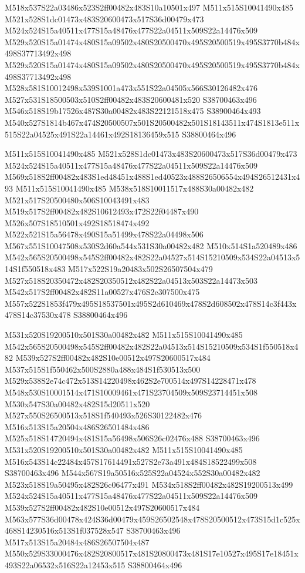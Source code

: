 \documentclass{article}
\begin{document}
\begin{multicols}{2}
M518x537S22a03486x523S2ff00482x483S10a10501x497 M511x515S10041490x485 M521x528S1dc01473x483S20600473x517S36d00479x473 M524x524S15a40511x477S15a48476x477S22a04511x509S22a14476x509 M529x520S15a01474x480S15a09502x480S20500470x495S20500519x495S3770b484x498S37713492x498 M529x520S15a01474x480S15a09502x480S20500470x495S20500519x495S3770b484x498S37713492x498 M528x581S10012498x539S1001a473x551S22a04505x566S30126482x476 M527x531S18500503x510S2ff00482x483S20600481x520 S38700463x496 M546x518S19b17526x487S30a00482x483S22121518x475 S38900464x493 M540x527S1814b467x474S20500507x501S20500482x501S18143511x474S1813e511x515S22a04525x491S22a14461x492S18136459x515 S38800464x496

M511x515S10041490x485 M521x528S1dc01473x483S20600473x517S36d00479x473 M524x524S15a40511x477S15a48476x477S22a04511x509S22a14476x509 M569x518S2ff00482x483S1ed48451x488S1ed40523x488S26506554x494S26512431x493 M511x515S10041490x485 M538x518S10011517x488S30a00482x482 M521x517S20500480x506S10043491x483 M519x517S2ff00482x482S10612493x472S22f04487x490 M526x507S18510501x492S18518474x492 M522x521S15a56478x490S15a51499x478S22a04498x506 M567x551S10047508x530S2d60a544x531S30a00482x482 M510x514S1a520489x486 M542x565S20500498x545S2ff00482x482S22a04527x514S15210509x534S22a04513x514S1f550518x483 M517x522S19a20483x502S26507504x479 M527x518S20350472x482S20350512x482S22a04513x503S22a14473x503 M542x517S2ff00482x482S11a00527x476S2e307500x475 M557x522S1853f479x495S18537501x495S2d610469x478S2d608502x478S14c3f443x478S14c37530x478 S38800464x496

M531x520S19200510x501S30a00482x482 M511x515S10041490x485 M542x565S20500498x545S2ff00482x482S22a04513x514S15210509x534S1f550518x482 M539x527S2ff00482x482S10e00512x497S20600517x484 M537x515S1f550462x500S2880a488x484S1f530513x500 M529x538S2e74c472x513S14220498x462S2e700514x497S14228471x478 M548x530S10001514x471S10009461x471S23704509x509S23714451x508 M530x547S30a00482x482S15d20511x520 M527x550S26500513x518S1f540493x526S30122482x476 M516x513S15a20504x486S26501484x486 M525x518S14720494x481S15a56498x506S26c02476x488 S38700463x496 M531x520S19200510x501S30a00482x482 M511x515S10041490x485 M516x543S14c22484x457S17614491x527S2e73a491x484S18522499x508 S38700463x496 M544x567S19a50516x525S22a04524x552S30a00482x482 M523x518S19a50495x482S26c06477x491 M534x518S2ff00482x482S19200513x499 M524x524S15a40511x477S15a48476x477S22a04511x509S22a14476x509 M539x527S2ff00482x482S10e00512x497S20600517x484 M563x577S36d00478x424S36d00479x459S26502548x478S20500512x473S15d1c525x468S14230516x513S1f037528x547 S38700463x496 M517x513S15a20484x486S26507504x487 M550x529S33000476x482S20800517x481S20800473x481S17e10527x495S17e18451x493S22a06532x516S22a12453x515 S38800464x496


\end{multicols}
\end{document}
